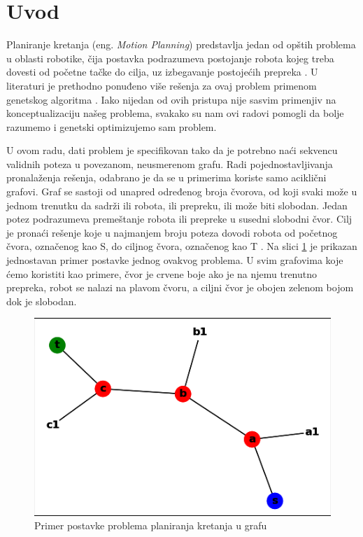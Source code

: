 \documentclass[12pt]{article}
\begin{document}
	\section{Uvod}
	\label{sec:uvod}  
	\par Planiranje kretanja (eng. \textit{Motion Planning}) predstavlja jedan od opštih problema u oblasti robotike, čija postavka podrazumeva postojanje robota kojeg treba dovesti od početne tačke do cilja, uz izbegavanje postojećih prepreka \cite{def}. U literaturi je prethodno ponuđeno više rešenja za ovaj problem primenom genetskog algoritma 
	\cite{gen2, gen1, gen3}. Iako nijedan od ovih pristupa nije sasvim primenjiv na konceptualizaciju našeg problema, svakako su nam ovi radovi pomogli da bolje razumemo i genetski optimizujemo sam problem. 
	\par U ovom radu, dati problem je specifikovan tako da je  potrebno naći sekvencu validnih poteza u povezanom, neusmerenom grafu. Radi pojednostavljivanja pronalaženja rešenja, odabrano je da se u primerima koriste samo aciklični grafovi. Graf se sastoji od unapred određenog broja čvorova, od koji svaki može u jednom trenutku da sadrži ili robota, ili prepreku, ili može biti slobodan. Jedan potez podrazumeva premeštanje robota ili prepreke u susedni slobodni čvor. Cilj je pronaći rešenje koje u najmanjem broju poteza dovodi robota od početnog čvora, označenog kao S, do ciljnog čvora, označenog kao T \cite{glavni}. 
	Na slici \ref{fig:slika1} je prikazan jednostavan primer postavke jednog ovakvog problema. U svim grafovima koje ćemo koristiti kao primere, čvor je crvene boje ako je na njemu trenutno prepreka, robot se nalazi na plavom čvoru, a ciljni čvor je obojen zelenom bojom dok je slobodan.
	\vspace*{1\baselineskip}
	\begin{figure}[h!]
		\begin{center}
			\includegraphics[scale=1]{graf.png}
		\end{center}
		\caption{Primer postavke problema planiranja kretanja u grafu}
		\label{fig:slika1}
	\end{figure}
	
\end{document}
